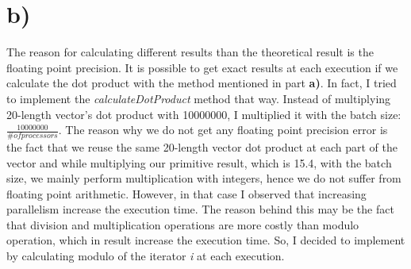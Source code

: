 \documentclass[12pt]{article}
\begin{document}
\section*{b)}
The reason for calculating different results than the theoretical result is the floating point precision. It is possible to get exact results at each execution if we calculate the dot product with the method mentioned in part \textbf{a)}. In fact, I tried to implement the \textit{calculateDotProduct} method that way. Instead of multiplying 20-length vector's dot product with 10000000, I multiplied it with the batch size: $\frac{10000000}{\# of processors}$. The reason why we do not get any floating point precision error is the fact that we reuse the same 20-length vector dot product at each part of the vector and while multiplying our primitive result, which is 15.4, with the batch size, we mainly perform multiplication with integers, hence we do not suffer from floating point arithmetic. However, in that case I observed that increasing parallelism increase the execution time. The reason behind this may be the fact that division and multiplication operations are more costly than modulo operation, which in result increase the execution time. So, I decided to implement by calculating modulo of the iterator \textit{i} at each execution.
\end{document}
